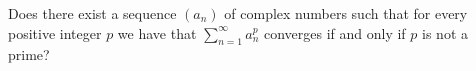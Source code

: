 \documentclass{article}
\begin{document}
\setlength{\parindent}{0pt}
Does there exist a sequence \( (a_n) \) of complex numbers such that for every positive integer \( p \) we have that \( \displaystyle\sum_{n=1}^{\infty} a_n^p \) converges if and only if \( p \) is not a prime?
\end{document}

